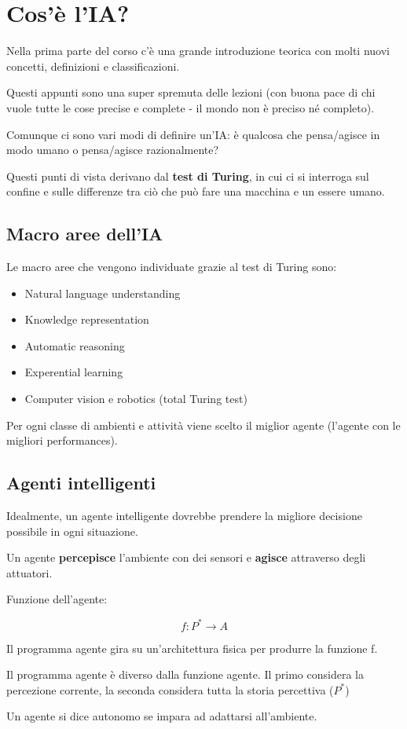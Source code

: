 \newpage

\section{Cos'è l'IA?}

Nella prima parte del corso c'è una grande introduzione teorica con molti
nuovi concetti, definizioni e classificazioni. 

Questi appunti sono una super spremuta delle lezioni (con buona pace di chi
vuole tutte le cose precise e complete - il mondo non è preciso né completo).

Comunque ci sono vari modi di definire un'IA: è qualcosa che pensa/agisce
in modo umano o pensa/agisce razionalmente?

Questi punti di vista derivano dal \textbf{test di Turing}, in cui ci si
interroga sul confine e sulle differenze tra ciò che può fare una macchina
e un essere umano.

\subsection{Macro aree dell'IA}

Le macro aree che vengono individuate grazie al test di Turing sono:

\begin{itemize}
 \item Natural language understanding
 \item Knowledge representation
 \item Automatic reasoning
 \item Experential learning
 \item Computer vision e robotics (total Turing test)
\end{itemize}

Per ogni classe di ambienti e attività viene scelto il miglior agente (l'agente
con le migliori performances).

\subsection{Agenti intelligenti}

Idealmente, un agente intelligente dovrebbe prendere la migliore decisione
possibile in ogni situazione.

Un agente \textbf{percepisce} l'ambiente con dei sensori e \textbf{agisce}
attraverso degli attuatori.

Funzione dell'agente:

\begin{equation}
f: P^* \rightarrow A
\end{equation}

Il programma agente gira su un'architettura fisica per produrre la funzione f.

Il programma agente è diverso dalla funzione agente. Il primo considera la
percezione corrente, la seconda considera tutta la storia percettiva ($P^*$)

Un agente si dice autonomo se impara ad adattarsi all'ambiente.
